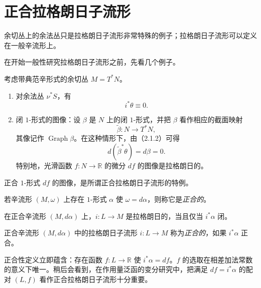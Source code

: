 \section{正合拉格朗日子流形}
\label{sec:exact-lagrangian-submanifolds}

余切丛上的余法丛只是拉格朗日子流形非常特殊的例子；拉格朗日子流形可以定义在一般辛流形上。

在开始一般性研究拉格朗日子流形之前，先看几个例子。

\begin{example}\label{ex:exact-lagrangian-cotangent}
考虑带典范辛形式的余切丛 $M=T^*N$。
\begin{enumerate}[label=(\arabic*)]
\item 对余法丛 $\nu^*S$，有
\begin{equation}
 i^*\theta\equiv0.
 \label{eq:conormal-liouville-zero}
\end{equation}
\item 闭 $1$-形式的图像：设 $\beta$ 是 $N$ 上的闭 $1$-形式，并把 $\beta$ 看作相应的截面映射
\[
 \widetilde\beta:N\longrightarrow T^*N,
\]
其像记作 $\operatorname{Graph}\beta$。在这种情形下，由（2.1.2）可得
\begin{equation}
 d(\widetilde\beta^*\theta)=d\beta=0.
 \label{eq:closed-one-form-graph}
\end{equation}
特别地，光滑函数 $f:N\to\mathbb R$ 的微分 $df$ 的图像是拉格朗日的。
\end{enumerate}
\end{example}

正合 $1$-形式 $df$ 的图像，是所谓正合拉格朗日子流形的特例。

\begin{definition}\label{def:exact-symplectic-manifold}
若辛流形 $(M,\omega)$ 上存在 $1$-形式 $\alpha$ 使 $\omega=d\alpha$，则称它是\emph{正合的}。
\end{definition}

在正合辛流形 $(M,d\alpha)$ 上，$i:L\to M$ 是拉格朗日的，当且仅当
$i^*\alpha$ 闭。

\begin{definition}\label{def:exact-lagrangian-submanifold}
正合辛流形 $(M,d\alpha)$ 中的拉格朗日子流形 $i:L\to M$ 称为\emph{正合的}，如果 $i^*\alpha$ 正合。
\end{definition}

正合性定义立即蕴含：存在函数 $f:L\to\mathbb R$ 使 $i^*\alpha=df$。$f$ 的选取在相差加法常数的意义下唯一。稍后会看到，在作用量泛函的变分研究中，把满足 $df=i^*\alpha$ 的配对 $(L,f)$ 看作正合拉格朗日子流形十分重要。

